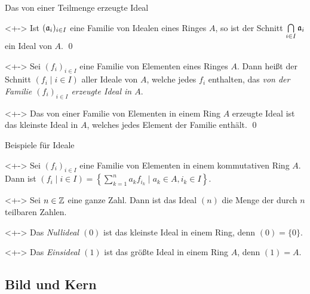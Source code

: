 \begin{frame}{Das von einer Teilmenge erzeugte Ideal}
    \begin{proposition}<+->
        Ist \((\mathfrak{a}_i)_{i \in I}\) eine Familie von Idealen eines
        Ringes \(A\),
        so ist der Schnitt \(\bigcap\limits_{i \in I} \mathfrak{a}_i\) ein Ideal
        von \(A\).
        \qed
    \end{proposition}
    \begin{definition}<+->
        Sei \((f_i)_{i \in I}\) eine Familie von Elementen eines Ringes \(A\).
        Dann heißt der Schnitt \((f_i \mid i \in I)\) aller Ideale
        von \(A\), welche jedes \(f_i\) enthalten, das \emph{von
        der Familie \((f_i)_{i \in I}\) erzeugte Ideal in \(A\)}.
    \end{definition}
    \begin{proposition}<+->
        Das von einer Familie von Elementen in einem Ring \(A\) erzeugte Ideal
        ist das kleinste Ideal in \(A\), welches jedes Element der Familie
        enthält.
        \qed
    \end{proposition}
\end{frame}

\begin{frame}{Beispiele für Ideale}
    \begin{example}<+->
        Sei \((f_i)_{i \in I}\) eine Familie von Elementen in einem kommutativen
        Ring \(A\). Dann ist
        \((f_i \mid i \in I)
        = \left\{\sum\limits_{k = 1}^n a_k f_{i_k} \mid a_k \in A,
        i_k \in I\right\}\).
    \end{example}
    \begin{example}<+->
        Sei \(n \in \mathbb Z\) eine ganze Zahl. Dann ist das Ideal \((n)\) die Menge
        der durch \(n\) teilbaren Zahlen.
    \end{example}
    \begin{example}<+->
        Das \emph{Nullideal \((0)\)} ist das kleinste Ideal in einem Ring, denn
        \((0) = \{0\}\).
    \end{example}
    \begin{example}<+->
        Das \emph{Einsideal \((1)\)} ist das größte Ideal in einem Ring \(A\), denn
        \((1) = A\).
    \end{example}
\end{frame}

\subsection{Bild und Kern}

